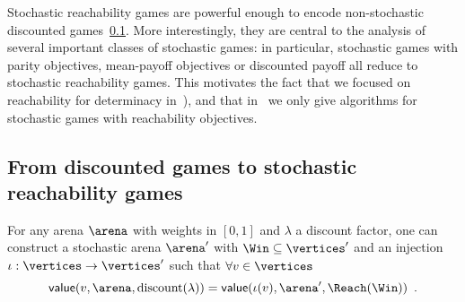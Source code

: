 Stochastic reachability games are powerful enough to encode
non-stochastic discounted games~\ref{}. More interestingly, they are
central to the analysis of several important classes of stochastic
games: in particular, stochastic games with parity objectives,
mean-payoff objectives or discounted payoff all reduce to stochastic
reachability games. This motivates the fact that we focused on
reachability for determinacy in~), and that
in~ we only give algorithms for stochastic games
with reachability objectives.




\subsection{From discounted games to stochastic reachability games}

\begin{proposition}
  \label{prop:dg2ssg}
  For any arena $\arena$ with weights in $[0,1]$ and $\lambda$ a
  discount factor, one can construct a stochastic arena $\arena'$ with
  $\Win \subseteq \vertices'$ and an injection
  $\iota : \vertices \to \vertices'$ such that
  $\forall v \in \vertices$
  \[
    \mathsf{value}(v,\arena,\textrm{discount}(\lambda)) =
    \mathsf{value}(\iota(v),\arena',\Reach(\Win)) \enspace.
  \]
\end{proposition}


